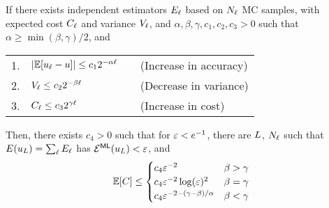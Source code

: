 \begin{frame}{\name{}}
    \begin{theorem}[]
        \small
        If there exists independent estimators $E_\ell$ based on $N_\ell$ MC samples, with expected cost $C_\ell$ and variance $V_\ell$, and $\alpha, \beta, \gamma, c_1, c_2, c_3 > 0$ such that $\alpha \geq \min(\beta, \gamma)/2$, and
        \begin{center}
            \begin{tabular}{rlcl}
                1. & $|\mathbb{E}[u_\ell - u]| \leq c_1 2^{-\alpha\ell}$ & & (Increase in accuracy) \\
                2. & $V_\ell \leq c_2 2^{-\beta \ell}$ & & (Decrease in variance) \\
                3. & $C_\ell \leq c_3 2^{\gamma \ell}$ & & (Increase in cost)
            \end{tabular}
        \end{center}
        Then, there exists $c_4>0$ such that for $\varepsilon < e^{-1}$, there are $L$, $N_\ell$ such that $E(u_L) = \sum_\ell E_\ell$ has $\mathcal{E}^{\mathsf{ML}}(u_L) < \varepsilon$, and
        \begin{align*}
            \mathbb{E}[C] \leq
            \begin{cases}
                c_4 \varepsilon^{-2} & \beta > \gamma \\
                c_4 \varepsilon^{-2}\log(\varepsilon)^2 & \beta = \gamma \\
                c_4 \varepsilon^{-2 - (\gamma - \beta)/\alpha} & \beta < \gamma \\
            \end{cases}
        \end{align*}
    \end{theorem}
\end{frame}